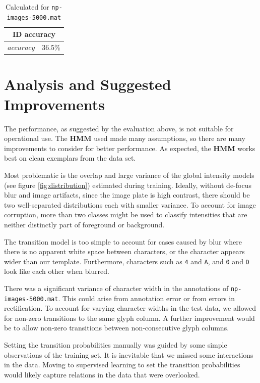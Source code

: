 \documentclass[a4paper,12pt]{article}
\begin{document}
\begin{table}[ht]
\begin{center}
\begin{tabular}{|l|l|}
  \hline
  \multicolumn{2}{|c|}{ID accuracy} \\
  \hline
  $accuracy$ & 36.5\% \\
  \hline
\end{tabular}
\caption{Calculated for \texttt{np-images-5000.mat}}
\end{center}
\end{table}

\section{Analysis and Suggested Improvements}
The performance, as suggested by the evaluation above, is not suitable
for operational use. The \textbf{HMM} used made many assumptions, so
there are many improvements to consider for better performance. As
expected, the \textbf{HMM} works best on clean exemplars from the data
set.

Most problematic is the overlap and large variance of the global
intensity models (see figure \ref{fig:distribution}) estimated during
training. Ideally, without de-focus blur and image artifacts, since the
image plate is high contrast, there should be two well-separated
distributions each with smaller variance. To account for image
corruption, more than two classes might be used to classify
intensities that are neither distinctly part of foreground or
background.

The transition model is too simple to account for cases caused by blur
where there is no apparent white space between characters, or the
character appears wider than our template. Furthermore, characters
such as \texttt{4} and \texttt{A}, and \texttt{0} and \texttt{D} look
like each other when blurred.

There was a significant variance of character width in the annotations
of \texttt{np-images-5000.mat}. This could arise from annotation error
or from errors in rectification. To
account for varying character widths in the test data, we allowed for 
non-zero transitions to the same glyph column.  A further improvement
would be to allow non-zero transitions between non-consecutive glyph
columns. 

Setting the transition probabilities manually was guided by some
simple observations of the training set. It is inevitable that we
missed some interactions in the data. Moving to supervised
learning to set the transition probabilities would likely capture
relations in the data that were overlooked. 
\end{document}
